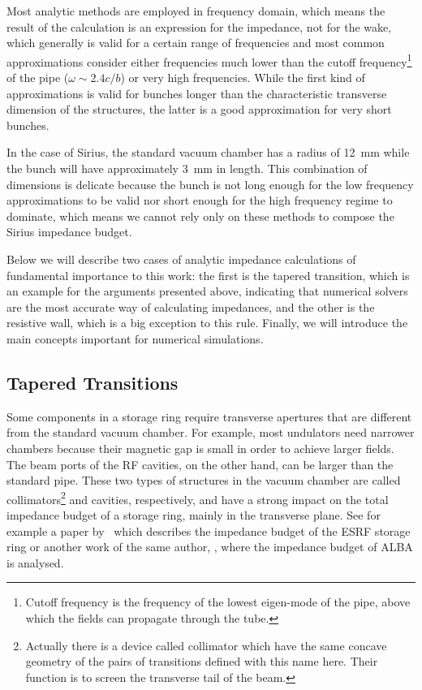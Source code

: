     Most analytic methods are employed in frequency domain, which means the result of the calculation is an expression for the impedance, not for the wake, which generally is valid for a certain range of frequencies and most common approximations consider either frequencies much lower than the cutoff frequency\footnote{Cutoff frequency is the frequency of the lowest eigen-mode of the pipe, above which the fields can propagate through the tube.} of the pipe ($\omega\sim2.4c/b$) or very high frequencies. While the first kind of approximations is valid for bunches longer than the characteristic transverse dimension of the structures, the latter is a good approximation for very short bunches.

    In the case of Sirius, the standard vacuum chamber has a radius of \SI{12}{\milli\meter} while the bunch will have approximately \SI{3}{\milli\meter} in length. This combination of dimensions is delicate because the bunch is not long enough for the low frequency approximations to be valid nor short enough for the high frequency regime to dominate, which means we cannot rely only on these methods to compose the Sirius impedance budget.

    Below we will describe two cases of analytic impedance calculations of fundamental importance to this work: the first is the tapered transition, which is an example for the arguments presented above, indicating that numerical solvers are the most accurate way of calculating impedances, and the other is the resistive wall, which is a big exception to this rule. Finally, we will introduce the main concepts important for numerical simulations.

\subsection{Tapered Transitions}\label{ssec:tapered_transitions}

    Some components in a storage ring require transverse apertures that are different from the standard vacuum chamber. For example, most undulators need narrower chambers because their magnetic gap is small in order to achieve larger fields. The beam ports of the RF cavities, on the other hand, can be larger than the standard pipe. These two types of structures in the vacuum chamber are called collimators\footnote{Actually there is a device called collimator which have the same concave geometry of the pairs of transitions defined with this name here. Their function is to screen the transverse tail of the beam.} and cavities, respectively, and have a strong impact on the total impedance budget of a storage ring, mainly in the transverse plane. See for example a paper by~ which describes the impedance budget of the ESRF storage ring or another work of the same author, , where the impedance budget of ALBA is analysed.

